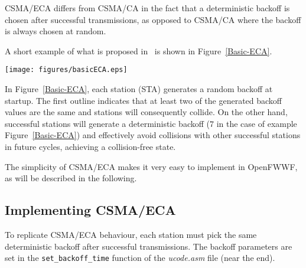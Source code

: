 \documentclass[conference]{IEEEtran}
\begin{document}

CSMA/ECA differs from CSMA/CA in the fact that a deterministic backoff is chosen after successful transmissions, as opposed to CSMA/CA where the backoff is always chosen at random.

A short example of what is proposed in~\cite{barcelo2008lba} is shown in Figure~\ref{Basic-ECA}.


\begin{figure*}[t]
\centering
  \texttt{[image: figures/basicECA.eps]}
  \caption{CSMA/ECA example in saturation}
  \label{Basic-ECA}
\end{figure*}

In Figure~\ref{Basic-ECA}, each station (STA) generates a random backoff at startup. The first outline indicates that at least two of the generated backoff values are the same and stations will consequently collide. On the other hand, successful stations will generate a deterministic backoff ($7$ in the case of example Figure~\ref{Basic-ECA}) and effectively avoid collisions with other successful stations in future cycles, achieving a collision-free state.


The simplicity of CSMA/ECA makes it very easy to implement in OpenFWWF, as will be described in the following.

\subsection{Implementing CSMA/ECA}
To replicate CSMA/ECA behaviour, each station must pick the same deterministic backoff after successful transmissions. The backoff parameters are set in the \texttt{set\_backoff\_time} function of the \emph{ucode.asm} file (near the end).
\end{document}
